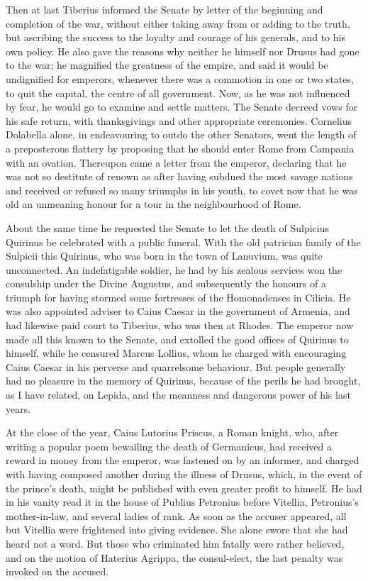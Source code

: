 
Then at last Tiberius informed the Senate by letter of the beginning and completion of the war, without either taking away from or adding to the truth, but ascribing the success to the loyalty and courage of his generals, and to his own policy. He also gave the reasons why neither he himself nor Drusus had gone to the war; he magnified the greatness of the empire, and said it would be undignified for emperors, whenever there was a commotion in one or two states, to quit the capital, the centre of all government. Now, as he was not influenced by fear, he would go to examine and settle matters. The Senate decreed vows for his safe return, with thanksgivings and other appropriate ceremonies. Cornelius Dolabella alone, in endeavouring to outdo the other Senators, went the length of a preposterous flattery by proposing that he should enter Rome from Campania with an ovation. Thereupon came a letter from the emperor, declaring that he was not so destitute of renown as after having subdued the most savage nations and received or refused so many triumphs in his youth, to covet now that he was old an unmeaning honour for a tour in the neighbourhood of Rome.


About the same time he requested the Senate to let the death of Sulpicius Quirinus be celebrated with a public funeral. With the old patrician family of the Sulpicii this Quirinus, who was born in the town of Lanuvium, was quite unconnected. An indefatigable soldier, he had by his zealous services won the consulship under the Divine Augustus, and subsequently the honours of a triumph for having stormed some fortresses of the Homonadenses in Cilicia. He was also appointed adviser to Caius Caesar in the government of Armenia, and had likewise paid court to Tiberius, who was then at Rhodes. The emperor now made all this known to the Senate, and extolled the good offices of Quirinus to himself, while he censured Marcus Lollius, whom he charged with encouraging Caius Caesar in his perverse and quarrelsome behaviour. But people generally had no pleasure in the memory of Quirinus, because of the perils he had brought, as I have related, on Lepida, and the meanness and dangerous power of his last years.


At the close of the year, Caius Lutorius Priscus, a Roman knight, who, after writing a popular poem bewailing the death of Germanicus, had received a reward in money from the emperor, was fastened on by an informer, and charged with having composed another during the illness of Drusus, which, in the event of the prince's death, might be published with even greater profit to himself. He had in his vanity read it in the house of Publius Petronius before Vitellia, Petronius's mother-in-law, and several ladies of rank. As soon as the accuser appeared, all but Vitellia were frightened into giving evidence. She alone swore that she had heard not a word. But those who criminated him fatally were rather believed, and on the motion of Haterius Agrippa, the consul-elect, the last penalty was invoked on the accused.

